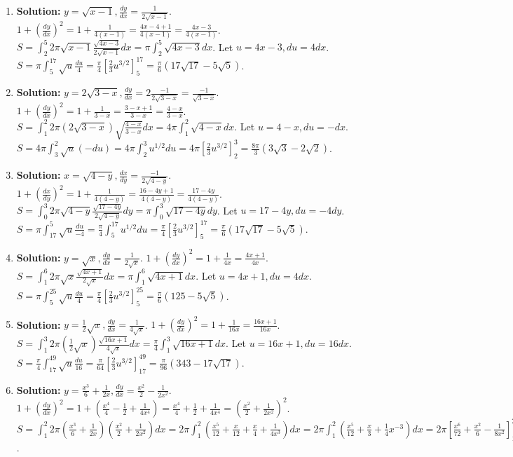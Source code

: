 \documentclass{article}
\begin{document}
\begin{enumerate}
\item \textbf{Solution:} $y=\sqrt{x-1}, \frac{dy}{dx}=\frac{1}{2\sqrt{x-1}}$. $1+(\frac{dy}{dx})^2 = 1+\frac{1}{4(x-1)} = \frac{4x-4+1}{4(x-1)} = \frac{4x-3}{4(x-1)}$.
$S=\int_2^5 2\pi \sqrt{x-1} \frac{\sqrt{4x-3}}{2\sqrt{x-1}} dx = \pi \int_2^5 \sqrt{4x-3} dx$.
Let $u=4x-3, du=4dx$. $S=\pi \int_5^{17} \sqrt{u} \frac{du}{4} = \frac{\pi}{4}[\frac{2}{3}u^{3/2}]_5^{17} = \frac{\pi}{6}(17\sqrt{17}-5\sqrt{5})$.

\item \textbf{Solution:} $y=2\sqrt{3-x}, \frac{dy}{dx}=2\frac{-1}{2\sqrt{3-x}}=\frac{-1}{\sqrt{3-x}}$. $1+(\frac{dy}{dx})^2 = 1+\frac{1}{3-x} = \frac{3-x+1}{3-x} = \frac{4-x}{3-x}$.
$S=\int_1^2 2\pi (2\sqrt{3-x}) \sqrt{\frac{4-x}{3-x}} dx = 4\pi \int_1^2 \sqrt{4-x} dx$.
Let $u=4-x, du=-dx$. $S=4\pi \int_3^2 \sqrt{u}(-du) = 4\pi \int_2^3 u^{1/2}du = 4\pi[\frac{2}{3}u^{3/2}]_2^3 = \frac{8\pi}{3}(3\sqrt{3}-2\sqrt{2})$.

\item \textbf{Solution:} $x=\sqrt{4-y}, \frac{dx}{dy}=\frac{-1}{2\sqrt{4-y}}$. $1+(\frac{dx}{dy})^2 = 1+\frac{1}{4(4-y)} = \frac{16-4y+1}{4(4-y)} = \frac{17-4y}{4(4-y)}$.
$S=\int_0^3 2\pi \sqrt{4-y} \frac{\sqrt{17-4y}}{2\sqrt{4-y}} dy = \pi \int_0^3 \sqrt{17-4y} dy$.
Let $u=17-4y, du=-4dy$. $S=\pi \int_{17}^5 \sqrt{u} \frac{du}{-4} = \frac{\pi}{4}\int_5^{17} u^{1/2}du = \frac{\pi}{4}[\frac{2}{3}u^{3/2}]_5^{17} = \frac{\pi}{6}(17\sqrt{17}-5\sqrt{5})$.

\item \textbf{Solution:} $y=\sqrt{x}, \frac{dy}{dx}=\frac{1}{2\sqrt{x}}$. $1+(\frac{dy}{dx})^2=1+\frac{1}{4x}=\frac{4x+1}{4x}$.
$S=\int_1^6 2\pi \sqrt{x} \frac{\sqrt{4x+1}}{2\sqrt{x}} dx = \pi \int_1^6 \sqrt{4x+1} dx$.
Let $u=4x+1, du=4dx$. $S=\pi \int_5^{25} \sqrt{u}\frac{du}{4} = \frac{\pi}{4}[\frac{2}{3}u^{3/2}]_5^{25} = \frac{\pi}{6}(125-5\sqrt{5})$.

\item \textbf{Solution:} $y=\frac{1}{2}\sqrt{x}, \frac{dy}{dx}=\frac{1}{4\sqrt{x}}$. $1+(\frac{dy}{dx})^2=1+\frac{1}{16x}=\frac{16x+1}{16x}$.
$S=\int_1^3 2\pi (\frac{1}{2}\sqrt{x}) \frac{\sqrt{16x+1}}{4\sqrt{x}} dx = \frac{\pi}{4} \int_1^3 \sqrt{16x+1} dx$.
Let $u=16x+1, du=16dx$. $S=\frac{\pi}{4}\int_{17}^{49} \sqrt{u}\frac{du}{16} = \frac{\pi}{64}[\frac{2}{3}u^{3/2}]_{17}^{49} = \frac{\pi}{96}(343-17\sqrt{17})$.

\item \textbf{Solution:} $y=\frac{x^3}{6}+\frac{1}{2x}, \frac{dy}{dx}=\frac{x^2}{2}-\frac{1}{2x^2}$. $1+(\frac{dy}{dx})^2 = 1+(\frac{x^4}{4}-\frac{1}{2}+\frac{1}{4x^4}) = \frac{x^4}{4}+\frac{1}{2}+\frac{1}{4x^4} = (\frac{x^2}{2}+\frac{1}{2x^2})^2$.
$S=\int_1^2 2\pi (\frac{x^3}{6}+\frac{1}{2x})(\frac{x^2}{2}+\frac{1}{2x^2})dx = 2\pi\int_1^2 (\frac{x^5}{12}+\frac{x}{12}+\frac{x}{4}+\frac{1}{4x^3})dx = 2\pi\int_1^2 (\frac{x^5}{12}+\frac{x}{3}+\frac{1}{4}x^{-3})dx = 2\pi[\frac{x^6}{72}+\frac{x^2}{6}-\frac{1}{8x^2}]_1^2 = \frac{47\pi}{36}$.


\end{enumerate}
\end{document}
